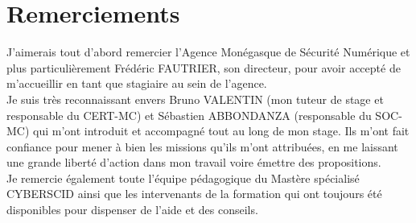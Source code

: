 \documentclass[a4paper, oneside, 12pt, final]{extreport}
\renewcommand*{\contentsname}{Table des matières}
\newcommand{\reportAuthor} {%
  Nouailhac \textsc{Baptiste}%
}
\begin{document}

%
%

\chapter*{Remerciements}
\thispagestyle{empty}
%

J’aimerais tout d’abord remercier l'Agence Monégasque de Sécurité Numérique et plus particulièrement Frédéric FAUTRIER, son directeur, pour avoir accepté de m'accueillir en tant que stagiaire au sein de l'agence. \\

Je suis très reconnaissant envers Bruno VALENTIN (mon tuteur de stage et responsable du CERT-MC) et Sébastien ABBONDANZA (responsable du SOC-MC) qui m'ont introduit et accompagné tout au long de mon stage. Ils m'ont fait confiance pour mener à bien les missions qu'ils m'ont attribuées, en me laissant une grande liberté d'action dans mon travail voire émettre des propositions.\\

Je remercie également toute l’équipe pédagogique du Mastère spécialisé CYBERSCID ainsi que les intervenants de la formation qui ont toujours été disponibles pour dispenser de l'aide et des conseils.




\tableofcontents

\listoffigures
\cleardoublepage
\end{document}
